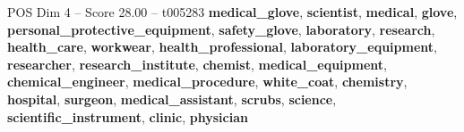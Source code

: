 \begin{textsample}{POS Dim 4 – Score 28.00 – t005283}  \label{ex:f4_pos_035}
\textbf{medical\_glove}, \textbf{scientist}, \textbf{medical}, \textbf{glove}, \textbf{personal\_protective\_equipment}, \textbf{safety\_glove}, \textbf{laboratory}, \textbf{research}, \textbf{health\_care}, \textbf{workwear}, \textbf{health\_professional}, \textbf{laboratory\_equipment}, \textbf{researcher}, \textbf{research\_institute}, \textbf{chemist}, \textbf{medical\_equipment}, \textbf{chemical\_engineer}, \textbf{medical\_procedure}, \textbf{white\_coat}, \textbf{chemistry}, \textbf{hospital}, \textbf{surgeon}, \textbf{medical\_assistant}, \textbf{scrubs}, \textbf{science}, \textbf{scientific\_instrument}, \textbf{clinic}, \textbf{physician}

\end{textsample}
